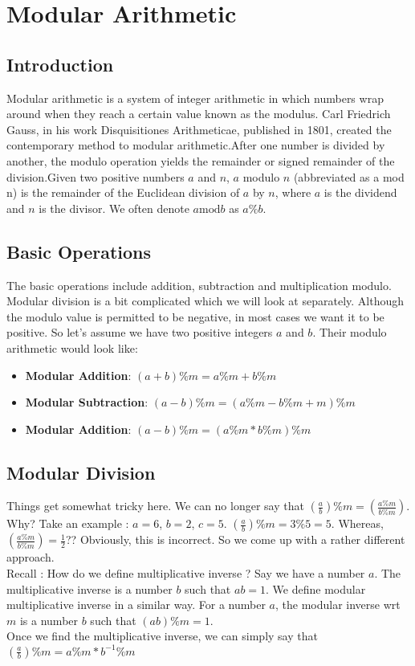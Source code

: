 \chapter{Modular Arithmetic}

\section{Introduction}

Modular arithmetic is a system of integer arithmetic in which numbers wrap around when they reach a certain value known as the modulus. Carl Friedrich Gauss, in his work Disquisitiones Arithmeticae, published in 1801, created the contemporary method to modular arithmetic.After one number is divided by another, the modulo operation yields the remainder or signed remainder of the division.Given two positive numbers $a$ and $n$, $a$ modulo $n$ (abbreviated as a mod n) is the remainder of the Euclidean division of $a$ by $n$, where $a$ is the dividend and $n$ is the divisor. We often denote $a \text{mod} b$ as $a\%b$.

\section{Basic Operations}
The basic operations include addition, subtraction and multiplication modulo. Modular division is a bit complicated which we will look at separately. Although the modulo value is permitted to be negative, in most cases we want it to be positive. So let's assume we have two positive integers $a$ and $b$. Their modulo arithmetic would look like:
\begin{itemize}
  \item \textbf{Modular Addition}: $(a+b)\%m = a\%m + b\%m$
  \item \textbf{Modular Subtraction}: $(a-b)\%m = (a\%m - b\%m + m)\%m$
  \item \textbf{Modular Addition}: $(a-b)\%m = (a\%m * b\%m)\%m$
\end{itemize}
\clearpage
\section{Modular Division}
Things get somewhat tricky here. We can no longer say that $(\frac{a}{b}) \%m = (\frac{a\%m}{b\%m})$. Why? Take an example : $a=6$, $b=2$, $c=5$. $(\frac{a}{b}) \%m  = 3 \%5 = 5$. Whereas, $(\frac{a\%m}{b\%m}) = \frac{1}{2}$?? Obviously, this is incorrect. So we come up with a rather different approach.\\
Recall : How do we define multiplicative inverse ? Say we have a number $a$. The multiplicative inverse is a number $b$ such that $ab  = 1$. We define modular multiplicative inverse in a similar way. For a number $a$, the modular inverse wrt $m$ is a number $b$ such that $(ab)\%m = 1$. \\
Once we find the multiplicative inverse, we can simply say that $(\frac{a}{b}) \% m  = a\%m*b^{-1}\%m$

